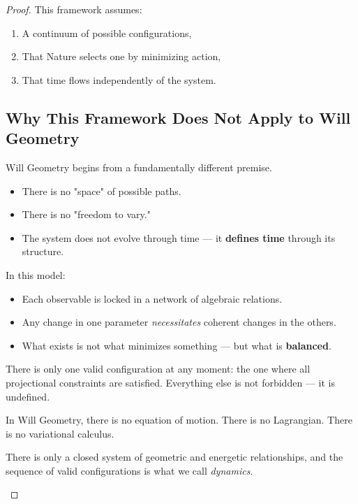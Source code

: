\documentclass{article}
\begin{document}
\begin{theorem}
\begin{proof}
This framework assumes:

\begin{enumerate}
    \item A continuum of possible configurations,
    \item That Nature selects one by minimizing action,
    \item That time flows independently of the system.
\end{enumerate}

\subsection*{Why This Framework Does Not Apply to Will Geometry}

Will Geometry begins from a fundamentally different premise.

\begin{itemize}
    \item There is no "space" of possible paths.
    \item There is no "freedom to vary."
    \item The system does not evolve through time --- it \textbf{defines time} through its structure.
\end{itemize}

In this model:

\begin{itemize}
    \item Each observable is locked in a network of algebraic relations.
    \item Any change in one parameter \textit{necessitates} coherent changes in the others.
    \item What exists is not what minimizes something --- but what is \textbf{balanced}.
\end{itemize}

There is only one valid configuration at any moment:  
the one where all projectional constraints are satisfied.  
Everything else is not forbidden — it is undefined.

\begin{tcolorbox}[colback=gray!5, colframe=black!80!black, title=Geometric Principle of Action]
In Will Geometry, there is no equation of motion.  
There is no Lagrangian.  
There is no variational calculus.  

There is only a closed system of geometric and energetic relationships,  
and the sequence of valid configurations is what we call \textit{dynamics}.
\end{tcolorbox}


\end{proof}
\end{theorem}
\end{document}
